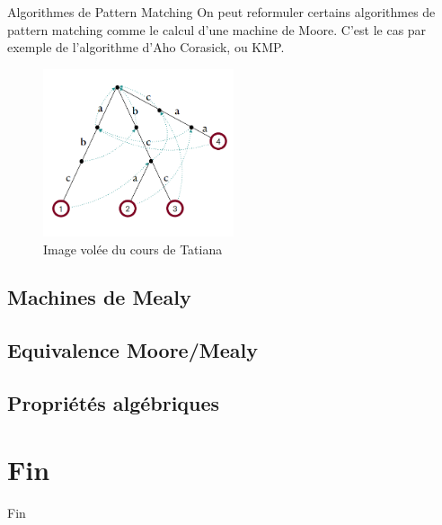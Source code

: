 \documentclass{beamer}
\begin{document}
\begin{frame}{Algorithmes de Pattern Matching}
    On peut reformuler certains algorithmes de pattern matching comme le calcul d'une machine de Moore.
    C'est le cas par exemple de l'algorithme d'Aho Corasick, ou KMP.

    \begin{figure}[h]
        \includegraphics[width = 0.5\textwidth]{Arbre Aho-Corasick.png}
        \\
        Image volée du cours de Tatiana
    \end{figure}
\end{frame}

\subsection{Machines de Mealy}

\subsection{Equivalence Moore/Mealy}

\subsection{Propriétés algébriques}

\section*{Fin}

\begin{frame}{Fin}
    
\end{frame}
\end{document}
